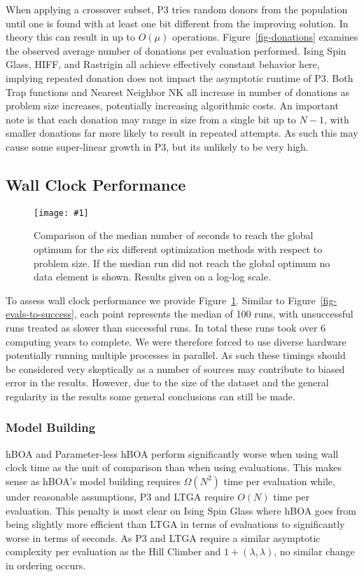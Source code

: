 \documentclass[twoside]{article}
\newcommand{\includegraphicsfit}[1]
{\texttt{[image: \#1]}}
\begin{document}
When applying a crossover subset, P3 tries random donors from the population until one is found with at least
one bit different from the improving solution. In theory this can result in up to $O(\mu)$ operations.
Figure~\ref{fig-donations} examines the observed average number of donations per evaluation performed.
Ising Spin Glass, HIFF, and Rastrigin all achieve effectively constant behavior here, implying repeated
donation does not impact the asymptotic runtime of P3. Both Trap functions and Nearest Neighbor NK all
increase in number of donations as problem size increases, potentially increasing algorithmic costs. An
important note is that each donation may range in size from a single bit up to $N-1$, with smaller
donations far more likely to result in repeated attempts. As such this may cause some super-linear growth
in P3, but its unlikely to be very high.

\subsection{Wall Clock Performance}
\begin{figure}
  \begin{center}
  \includegraphicsfit{seconds-to-success}
  \end{center}
  \caption{Comparison of the median number of seconds to reach the global optimum for
           the six different optimization methods with respect
           to problem size.  If the median run did not reach the global optimum no data element
           is shown.  Results given on a log-log scale.}
  \label{fig-seconds-to-success}
\end{figure}


To assess wall clock performance we provide Figure~\ref{fig-seconds-to-success}.
Similar to Figure~\ref{fig-evals-to-success}, each point represents the median
of 100 runs, with unsuccessful runs treated as slower than successful runs.
In total these runs
took over 6 computing years to complete. We were therefore forced to use
diverse hardware potentially running multiple processes in parallel.
As such these timings should be considered very skeptically as a number
of sources may contribute to biased error in the results. However, due to
the size of the dataset and the general regularity in the results some general conclusions
can still be made.

\subsubsection{Model Building}
hBOA and Parameter-less hBOA perform significantly worse when using wall clock time as the unit of comparison than when using
evaluations. This makes sense as hBOA's model building requires $\Omega(N^2)$ time per evaluation while, under reasonable
assumptions, P3 and LTGA require $O(N)$ time per evaluation. This penalty is most clear on Ising Spin Glass where
hBOA goes from being slightly more efficient than LTGA in terms of evaluations to significantly worse in terms of seconds.
As P3 and LTGA require a similar asymptotic complexity per
evaluation as the Hill Climber and $1+(\lambda, \lambda)$, no similar change in ordering occurs.
\end{document}
